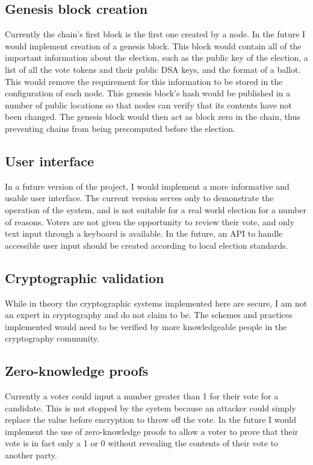 \documentclass[a4paper,12pt]{article}
\begin{document}
\subsection{Genesis block creation}
Currently the chain's first block is the first one created by a node. In the future I would implement creation of a genesis block. This block would contain all of the important information about the election, such as the public key of the election, a list of all the vote tokens and their public DSA keys, and the format of a ballot. This would remove the requirement for this information to be stored in the configuration of each node. This genesis block's hash would be published in a number of public locations so that nodes can verify that its contents have not been changed. The genesis block would then act as block zero in the chain, thus preventing chains from being precomputed before the election.

\subsection{User interface}
In a future version of the project, I would implement a more informative and usable user interface. The current version serves only to demonstrate the operation of the system, and is not suitable for a real world election for a number of reasons. Voters are not given the opportunity to review their vote, and only text input through a keyboard is available. In the future, an API to handle accessible user input should be created according to local election standards.

\subsection{Cryptographic validation}
While in theory the cryptographic systems implemented here are secure, I am not an expert in cryptography and do not claim to be. The schemes and practices implemented would need to be verified by more knowledgeable people in the cryptography community.

\subsection{Zero-knowledge proofs}
Currently a voter could input a number greater than 1 for their vote for a candidate. This is not stopped by the system because an attacker could simply replace the value before encryption to throw off the vote. In the future I would implement the use of zero-knowledge proofs to allow a voter to prove that their vote is in fact only a 1 or 0 without revealing the contents of their vote to another party.
\end{document}
